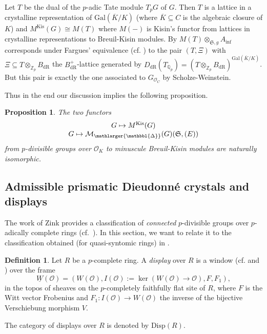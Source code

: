 \documentclass{amsart}
\newcommand{\prism}{{\mathlarger{\mathbbl{\Delta}}}}
\theoremstyle{plain}
\newtheorem{proposition}[theorem]{Proposition}
\theoremstyle{definition}
\newtheorem{definition}[theorem]{Definition}
\newcommand{\dR}{\mathrm{dR}}
\renewcommand{\inf}{\mathrm{inf}}
\newcommand{\Q}{\mathbb{Q}}
\newcommand{\Z}{\mathbb{Z}}
\newcommand{\red}[1]{{\color{black} #1}}
\begin{document}
    Let $T$ be the dual of the $p$-adic Tate module $T_pG$ of $G$. Then $T$ is a lattice in a crystalline representation of $\mathrm{Gal}(\overline{K}/K)$ (where $\overline{K}\subseteq C$ is the algebraic closure of $K$) and $M^{\mathrm{Kis}}(G)\cong M(T)$ where $M(-)$ is Kisin's functor from lattices in crystalline representations to Breuil-Kisin modules.
  By \cite[Proposition 4.34]{bhatt_morrow_scholze_integral_p_adic_hodge_theory} $M(T)\otimes_{\mathfrak{S},g}A_\inf$ corresponds under Fargues' equivalence (cf.  \cite[Theorem 14.1.1]{scholze2020berkeley}) to the pair $(T,\Xi)$ with $\Xi\subseteq T\otimes_{\Z_p} B_{\dR}$ the $B^+_{\dR}$-lattice generated by $D_{\dR}(T_{\Q_p})=(T\otimes_{\Z_p}B_{\dR})^{\mathrm{Gal}(\overline{K}/K)}$. But this pair is exactly the one associated to $G_{\mathcal{O}_C}$ by Scholze-Weinstein.


  Thus in the end our discussion implies the following proposition.
  
\begin{proposition}
  \label{sec:comp-over-mathc-comparison-of-kisins-functor-with-prismatic-one}
  The two functors
  $$
  \begin{matrix}
    G\mapsto M^{\mathrm{Kis}}(G)\\
    G\mapsto \mathcal{M}_{\prism}(G)(\mathfrak{S},(E))
  \end{matrix}
  $$
  from $p$-divisible groups over $\mathcal{O}_K$ to minuscule Breuil-Kisin modules are naturally isomorphic.
\end{proposition}



\subsection{\red{Admissible} prismatic Dieudonn\'e crystals and displays} 
\label{sec:comparison-with-zink-displays}
The work of Zink provides a classification of \textit{connected} $p$-divisible groups over $p$-adically complete rings (cf.\ \cite{zink_the_display_of_a_formal_p_divisible_group}). In this section, we want to relate it to the classification obtained (for quasi-syntomic rings) in .

\begin{definition} \label{def-displays}
Let $R$ be a $p$-complete ring. A \textit{display} over $R$ is a window (cf.  and \cite[Example 5.4]{lau_divided_dieudonne_crystals}) over the frame 
$$ \underline{W}(\mathcal{O}) = (W(\mathcal{O}), I(\mathcal{O}):=\ker(W(\mathcal{O}) \to \mathcal{O}), F, F_1), $$
in the topos of sheaves on the $p$-completely faithfully flat site of $R$, where $F$ is the Witt vector Frobenius and \red{$F_1\colon I(\mathcal{O}) \to W(\mathcal{O})$} the inverse of the bijective Verschiebung morphism $V$.

The category of displays over $R$ is denoted by $\mathrm{Disp}(R)$. 
\end{definition}
\end{document}
